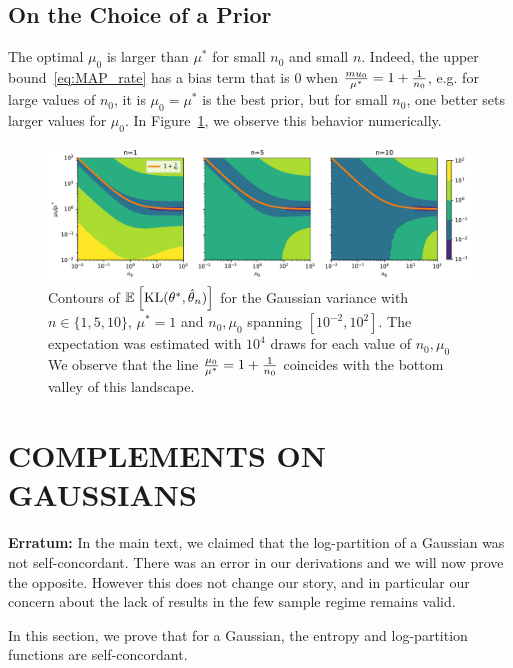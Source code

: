 \documentclass[twoside]{article}
\newcommand*{\expect}[2][]{\ensuremath{\mathbb{E}_{#1} \left[ #2 \right] }} %
\newcommand{\nat}{\theta}
\begin{document}
\subsection{On the Choice of a Prior}
The optimal $\mu_0$ is larger than $\mu^*$ for small $n_0$ and small $n$.
Indeed, the upper bound~\eqref{eq:MAP_rate} has a bias term that is $0$ when $\frac{mu_0}{\mu^*} = 1 + \frac{1}{n_0}$, e.g. for large values of $n_0$, it is $\mu_0=\mu^*$ is the best prior, but for small $n_0$, one better sets larger values for $\mu_0$. In Figure~\ref{fig:optimal_n0}, we observe this behavior numerically.

\begin{figure}[ht]
	\centering
	\includegraphics[width=\textwidth]{figs/optimal_n0.pdf}
	\caption{Contours of $\expect{\KL(\nat^*, \hat \nat_n)}$  for the Gaussian variance with $n\in\{1,5,10\}$, $\mu^*=1$ and $n_0, \mu_0$ spanning $[10^{-2}, 10^2]$. The expectation was estimated with $10^4$ draws for each value of $n_0, \mu_0$ We observe that the line $\frac{\mu_0}{\mu^*} = 1 + \frac{1}{n_0}$ coincides with the bottom valley of this landscape.
	}
	\label{fig:optimal_n0}
\end{figure}


\section{COMPLEMENTS ON GAUSSIANS}
\label{app:gaussian}

\begin{important}
	{\bf Erratum:}  
	In the main text, we claimed that the log-partition of a Gaussian was not self-concordant. 
	There was an error in our derivations and we will now prove the opposite.
	However this does not change our story, and in particular our concern about the lack of results in the few sample regime remains valid.
\end{important}

In this section, we prove that for a Gaussian, the entropy and log-partition functions are self-concordant.
\end{document}
